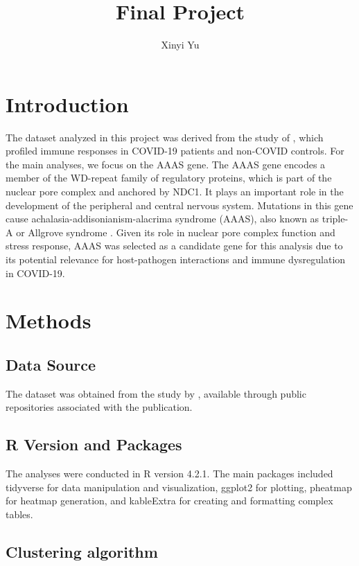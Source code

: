 \documentclass{article}
\title{Final Project}
\author{Xinyi Yu}
\begin{document}
\maketitle

\section{Introduction}

The dataset analyzed in this project was derived from the study of \cite{overmyer_large-scale_2021}, which profiled immune responses in COVID-19 patients and non-COVID controls. For the main analyses, we focus on the AAAS gene. The AAAS gene encodes a member of the WD-repeat family of regulatory proteins, which is part of the nuclear pore complex and anchored by NDC1. It plays an important role in the development of the peripheral and central nervous system. Mutations in this gene cause achalasia-addisonianism-alacrima syndrome (AAAS), also known as triple-A or Allgrove syndrome \cite{pubchem_aaas_nodate}. Given its role in nuclear pore complex function and stress response, AAAS was selected as a candidate gene for this analysis due to its potential relevance for host-pathogen interactions and immune dysregulation in COVID-19.


\section{Methods}

\subsection{Data Source}

The dataset was obtained from the study by \cite{overmyer_large-scale_2021}, available through public repositories associated with the publication.

\subsection{R Version and Packages}

The analyses were conducted in R version 4.2.1. The main packages included tidyverse \cite{tidyverse2019} for data manipulation and visualization, ggplot2 \cite{ggplot22016} for plotting, pheatmap \cite{pheatmap2025} for heatmap generation, and kableExtra \cite{kableExtra2021} for creating and formatting complex tables.

\subsection{Clustering algorithm}
\end{document}
